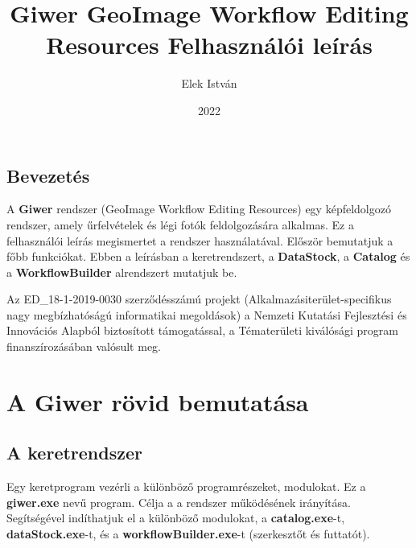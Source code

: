 \documentclass[a4paper,12pt]{book}
\begin{document}
\author{Elek István}

\title{Giwer \linebreak \linebreak GeoImage Workflow Editing Resources  \linebreak  \linebreak \small Felhasználói leírás \linebreak \linebreak}


\date{2022}


\setcounter{tocdepth}{3}
\maketitle
\newpage
\tableofcontents
\newpage


\section*{Bevezetés}

A \textbf{Giwer} rendszer (GeoImage Workflow Editing Resources) egy képfeldolgozó rendszer, amely űrfelvételek és légi fotók feldolgozására alkalmas. Ez a felhasználói leírás megismertet a rendszer használatával. Először bemutatjuk a főbb funkciókat. Ebben a leírásban a keretrendszert, a \textbf{DataStock}, a \textbf{Catalog} és a \textbf{WorkflowBuilder} alrendszert mutatjuk be. 

Az ED\_18-1-2019-0030 szerződésszámú projekt (Alkalmazásiterület-specifikus nagy megbízhatóságú informatikai megoldások)  a Nemzeti Kutatási Fejlesztési és Innovációs Alapból biztosított támogatással, a Tématerületi kiválósági program finanszírozásában valósult meg.



\chapter{A Giwer rövid bemutatása}

\section{A keretrendszer}

Egy keretprogram vezérli a különböző programrészeket, modulokat. Ez a \textbf{giwer.exe} nevű program. Célja a a rendszer működésének irányítása. Segítségével indíthatjuk el a különböző modulokat, a \textbf{catalog.exe}-t, \textbf{dataStock.exe}-t, és a \textbf{workflowBuilder.exe}-t (szerkesztőt és futtatót). 
\end{document}
